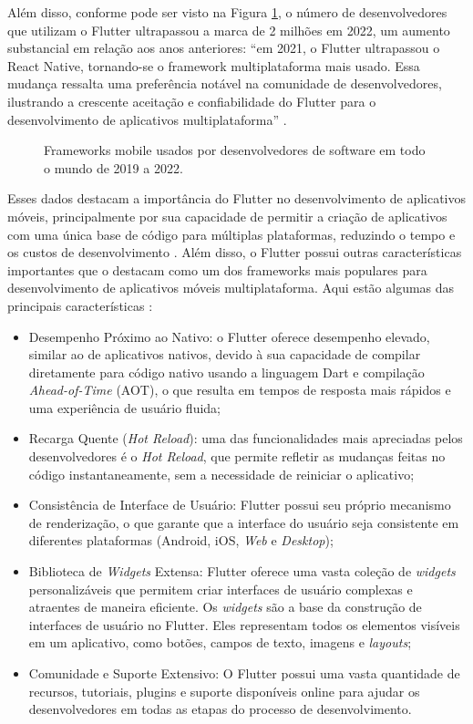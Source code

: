 \documentclass[12pt]{article}
\begin{document}
Além disso, conforme pode ser visto na Figura \ref{fig:cross-platform}, o número de desenvolvedores que utilizam o Flutter ultrapassou a marca de 2 milhões em 2022, um aumento substancial em relação aos anos anteriores: ``em 2021, o Flutter ultrapassou o React Native, tornando-se o framework multiplataforma mais usado. Essa mudança ressalta uma preferência notável na comunidade de desenvolvedores, ilustrando a crescente aceitação e confiabilidade do Flutter para o desenvolvimento de aplicativos multiplataforma'' \cite{programace}.

\begin{figure}[!htb]
\centering
{}
\caption{Frameworks mobile usados por desenvolvedores de software em todo o mundo de 2019 a 2022. \cite{programace}}
\label{fig:cross-platform}
\end{figure}

Esses dados destacam a importância do Flutter no desenvolvimento de aplicativos móveis, principalmente por sua capacidade de permitir a criação de aplicativos com uma única base de código para múltiplas plataformas, reduzindo o tempo e os custos de desenvolvimento \cite{sattar}. Além disso, o Flutter possui outras características importantes que o destacam como um dos frameworks mais populares para desenvolvimento de aplicativos móveis multiplataforma. Aqui estão algumas das principais características \cite{lopes, sacramento, sattar}:

\begin{itemize}
    \item Desempenho Próximo ao Nativo: o Flutter oferece desempenho elevado, similar ao de aplicativos nativos, devido à sua capacidade de compilar diretamente para código nativo usando a linguagem Dart e compilação \textit{Ahead-of-Time} (AOT), o que resulta em tempos de resposta mais rápidos e uma experiência de usuário fluida;
    \item Recarga Quente (\textit{Hot Reload}): uma das funcionalidades mais apreciadas pelos desenvolvedores é o \textit{Hot Reload}, que permite refletir as mudanças feitas no código instantaneamente, sem a necessidade de reiniciar o aplicativo;
    \item Consistência de Interface de Usuário: Flutter possui seu próprio mecanismo de renderização, o que garante que a interface do usuário seja consistente em diferentes plataformas (Android, iOS, \textit{Web} e \textit{Desktop});
    \item Biblioteca de \textit{Widgets} Extensa: Flutter oferece uma vasta coleção de \textit{widgets} personalizáveis que permitem criar interfaces de usuário complexas e atraentes de maneira eficiente. Os \textit{widgets} são a base da construção de interfaces de usuário no Flutter. Eles representam todos os elementos visíveis em um aplicativo, como botões, campos de texto, imagens e \textit{layouts};
    \item Comunidade e Suporte Extensivo: O Flutter possui uma vasta quantidade de recursos, tutoriais, plugins e suporte disponíveis online para ajudar os desenvolvedores em todas as etapas do processo de desenvolvimento.
\end{itemize}
\end{document}
